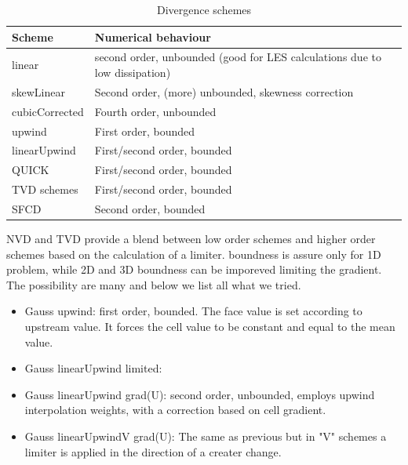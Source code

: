 \documentclass[a4paper,12pt]{article}
\begin{document}
\begin{table}[]
\centering
\begin{tabular}{ll}
\toprule
Scheme         & Numerical behaviour                                                               \\ \midrule
linear         & second order, unbounded (good for LES calculations due to low dissipation) \\
skewLinear     & Second order, (more) unbounded, skewness correction                               \\
cubicCorrected & Fourth order, unbounded                                                           \\
upwind         & First order, bounded                                                              \\
linearUpwind   & First/second order, bounded                                                       \\
QUICK          & First/second order, bounded                                                       \\
TVD schemes    & First/second order, bounded                                                       \\
SFCD           & Second order, bounded                                                             \\ \bottomrule
\end{tabular}
\caption{Divergence schemes}
\label{table:divergence}
\end{table}

NVD and TVD provide a blend between low order schemes and higher order schemes based on the calculation of a limiter. boundness is assure only for 1D problem, while 2D and 3D boundness can be imporeved limiting the gradient.
\\The possibility are many and below we list all what we tried.

\begin{itemize} 

 \item {\ttfamily Gauss upwind}: first order, bounded. The face value is set according to upstream value. It forces the cell value to be constant and equal to the mean value.
 
 \item {\ttfamily Gauss linearUpwind limited}:
 
 \item {\ttfamily Gauss linearUpwind grad(U)}: second order, unbounded, employs upwind interpolation weights, with a correction based on cell gradient.
 
 \item {\ttfamily Gauss linearUpwindV grad(U)}: The same as previous but in "V" schemes a limiter is applied in the direction of a creater change.

\end{itemize} 
\end{document}
